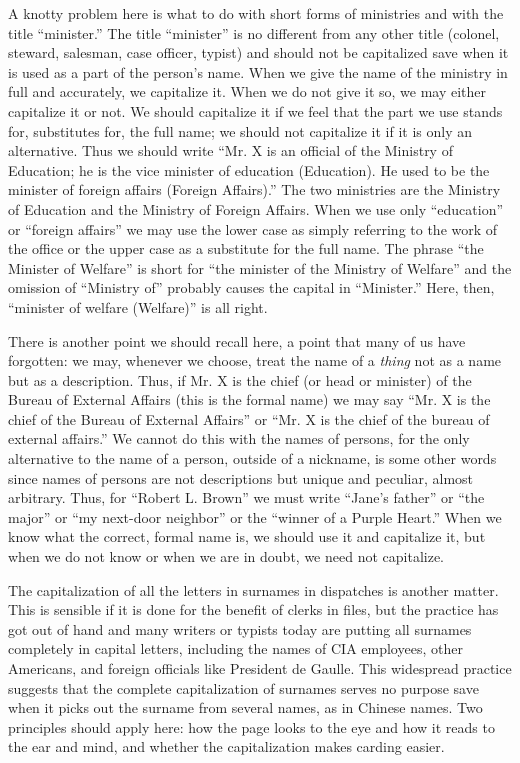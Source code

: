 \documentclass[
    oneside,
    11pt,
    draft
]{memoir}
\begin{document}
A knotty problem here is what to do with short forms of ministries and with the title \enquote{minister.} The title \enquote{minister} is no different from any other title (colonel, steward, salesman, case officer, typist) and should not be capitalized save when it is used as a part of the person's name. When we give the name of the ministry in full and accurately, we capitalize it. When we do not give it so, we may either capitalize it or not. We should capitalize it if we feel that the part we use stands for, substitutes for, the full name; we should not capitalize it if it is only an alternative. Thus we should write \enquote{Mr. X is an official of the Ministry of Education; he is the vice minister of education (Education). He used to be the minister of foreign affairs (Foreign Affairs).} The two ministries are the Ministry of Education and the Ministry of Foreign Affairs. When we use only \enquote{education} or \enquote{foreign affairs} we may use the lower case as simply referring to the work of the office or the upper case as a substitute for the full name. The phrase \enquote{the Minister of Welfare} is short for \enquote{the minister of the Ministry of Welfare} and the omission of \enquote{Ministry of} probably causes the capital in \enquote{Minister.} Here, then, \enquote{minister of welfare (Welfare)} is all right. 

There is another point we should recall here, a point that many of us have forgotten: we may, whenever we choose, treat the name of a \emph{thing} not as a name but as a description. Thus, if Mr. X is the chief (or head or minister) of the Bureau of External Affairs (this is the formal name) we may say \enquote{Mr. X is the chief of the Bureau of External Affairs} or \enquote{Mr. X is the chief of the bureau of external affairs.} We cannot do this with the names of persons, for the only alternative to the name of a person, outside of a nickname, is some other words since names of persons are not descriptions but unique and peculiar, almost arbitrary. Thus, for \enquote{Robert L. Brown} we must write \enquote{Jane's father} or \enquote{the major} or \enquote{my next-door neighbor} or the \enquote{winner of a Purple Heart.} When we know what the correct, formal name is, we should use it and capitalize it, but when we do not know or when we are in doubt, we need not capitalize. 

The capitalization of all the letters in surnames in dispatches is another matter. This is sensible if it is done for the benefit of clerks in files, but the practice has got out of hand and many writers or typists today are putting all surnames completely in capital letters, including the names of CIA employees, other Americans, and foreign officials like President de Gaulle. This widespread practice suggests that the complete capitalization of surnames serves no purpose save when it picks out the surname from several names, as in Chinese names. Two principles should apply here: how the page looks to the eye and how it reads to the ear and mind, and whether the capitalization makes carding easier. 
\end{document}
